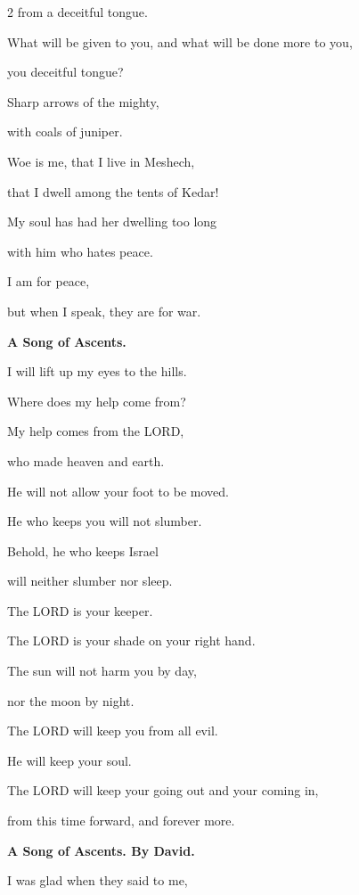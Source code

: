\begin{multicols}{2}
	from a deceitful tongue.
	
	
	\myverse{}What will be given to you, and what will be done more to you,
	
	you deceitful tongue?
	
	
	\myverse{}Sharp arrows of the mighty,
	
	with coals of juniper.
	
	
	\myverse{}Woe is me, that I live in Meshech,
	
	that I dwell among the tents of Kedar!
	
	
	\myverse{}My soul has had her dwelling too long
	
	with him who hates peace.
	
	
	\myverse{}I am for peace,
	
	but when I speak, they are for war.
	
	
	\mychapter{}\textbf{A Song of Ascents.}
	
\quad\quad\quad	\myverse*{}I will lift up my eyes to the hills.
	
	Where does my help come from?
	
	
	\myverse{}My help comes from the LORD,
	
	who made heaven and earth.
	
	\vspace{\baselineskip}
	
	\myverse{}He will not allow your foot to be moved.
	
	He who keeps you will not slumber.
	
	
	\myverse{}Behold, he who keeps Israel
	
	will neither slumber nor sleep.
	
	
	\myverse{}The LORD is your keeper.
	
	The LORD is your shade on your right hand.
	
	
	\myverse{}The sun will not harm you by day,
	
	nor the moon by night.
	
	
	\myverse{}The LORD will keep you from all evil.
	
	He will keep your soul.
	
	
	\myverse{}The LORD will keep your going out and your coming in,
	
	from this time forward, and forever more.
	
	
	\mychapter{}\textbf{A Song of Ascents. By David.}
	
\quad\quad\quad	\myverse*{}I was glad when they said to me,
	

\end{multicols}
